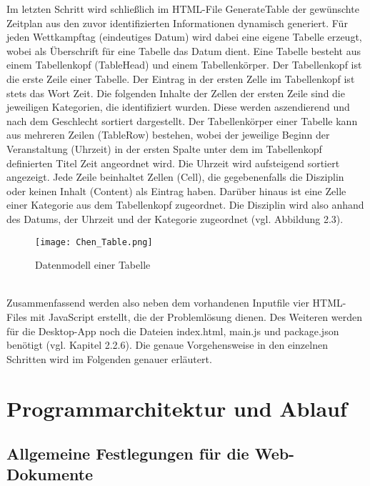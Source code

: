 Im letzten Schritt wird schließlich im HTML-File GenerateTable der gewünschte Zeitplan aus den zuvor identifizierten Informationen dynamisch generiert. Für jeden Wettkampftag (eindeutiges Datum) wird dabei eine eigene Tabelle erzeugt, wobei als Überschrift für eine Tabelle das Datum dient. 
Eine Tabelle besteht aus einem Tabellenkopf (TableHead) und einem Tabellenkörper. Der Tabellenkopf ist die erste Zeile einer Tabelle. Der Eintrag in der ersten Zelle im Tabellenkopf ist stets das Wort Zeit. Die folgenden Inhalte der Zellen der ersten Zeile sind die jeweiligen Kategorien, die identifiziert wurden. Diese werden aszendierend und nach dem Geschlecht sortiert dargestellt. 
Der Tabellenkörper einer Tabelle kann aus mehreren Zeilen (TableRow) bestehen, wobei der jeweilige Beginn der Veranstaltung (Uhrzeit) in der ersten Spalte unter dem im Tabellenkopf definierten Titel Zeit angeordnet wird. Die Uhrzeit wird aufsteigend sortiert angezeigt. Jede Zeile beinhaltet Zellen (Cell), die gegebenenfalls die Disziplin oder keinen Inhalt (Content) als Eintrag haben. Darüber hinaus ist eine Zelle einer Kategorie aus dem Tabellenkopf zugeordnet. Die Disziplin wird also anhand des Datums, der Uhrzeit und der Kategorie zugeordnet (vgl. Abbildung 2.3).
\begin{figure}[htbp]
  \centering
  \texttt{[image: Chen\_Table.png]}
  \caption{Datenmodell einer Tabelle}
  \label{fig:Fig1}
\end{figure} \\
Zusammenfassend werden also neben dem vorhandenen Inputfile vier HTML-Files mit JavaScript erstellt, die der Problemlösung dienen. Des Weiteren werden für die Desktop-App noch die Dateien index.html, main.js und package.json benötigt (vgl. Kapitel 2.2.6). Die genaue Vorgehensweise in den einzelnen Schritten wird im Folgenden genauer erläutert.

\section{Programmarchitektur und Ablauf}

\subsection{Allgemeine Festlegungen für die Web-Dokumente}

